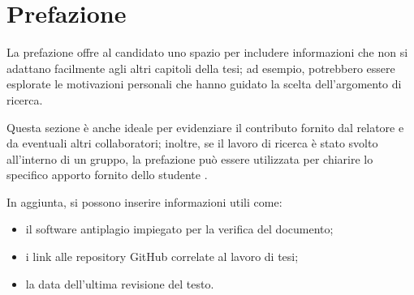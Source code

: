 \chapter*{Prefazione}

La prefazione offre al candidato uno spazio per includere informazioni che non si adattano facilmente agli altri capitoli della tesi; ad esempio, potrebbero essere esplorate le motivazioni personali che hanno guidato la scelta dell'argomento di ricerca.

\medskip

Questa sezione è anche ideale per evidenziare il contributo fornito dal relatore e da eventuali altri collaboratori; inoltre, se il lavoro di ricerca è stato svolto all'interno di un gruppo, la prefazione può essere utilizzata per chiarire lo specifico apporto fornito dello studente \cite{tuni2019guide}.

\medskip

In aggiunta, si possono inserire informazioni utili come:
\begin{itemize}
\item il software antiplagio impiegato per la verifica del documento;
\item i link alle repository GitHub correlate al lavoro di tesi;
\item la data dell'ultima revisione del testo.
\end{itemize}

